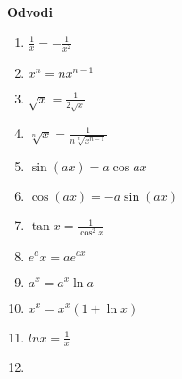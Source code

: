 
\textbf{Odvodi}
\begin{center}
    \begin{small}
        \begin{enumerate}
            \item \begin{math}
                \frac{1}{x} = -\frac{1}{x^2}
            \end{math}
            \item \begin{math}
                x^n  = nx^{n-1}
            \end{math}
            \item \begin{math}
                \sqrt{x} = \frac{1}{2 \sqrt{x}}
            \end{math}
            \item \begin{math}
                \sqrt[n] x = \frac{1}{n \sqrt[n]{x^{n-1}}}
            \end{math}
            \item \begin{math}
                \sin (a x) =  a  \cos a x
            \end{math}
            \item  \begin{math}
                \cos (a x) = - a \sin (a x)
            \end{math}
            \item \begin{math}
                \tan x = \frac{1}{\cos^2 x} 
            \end{math}
            \item \begin{math}
                e^ax = ae^{ax}
            \end{math}
            \item \begin{math}
                a^x = a^x \ln a
            \end{math}
            \item \begin{math}
                x^x = x^x (1+\ln x)
            \end{math}
            \item \begin{math}
                ln x = \frac{1}{x}
            \end{math}
            \item \begin{math}

\end{math}
\end{enumerate}
\end{small}
\end{center}
